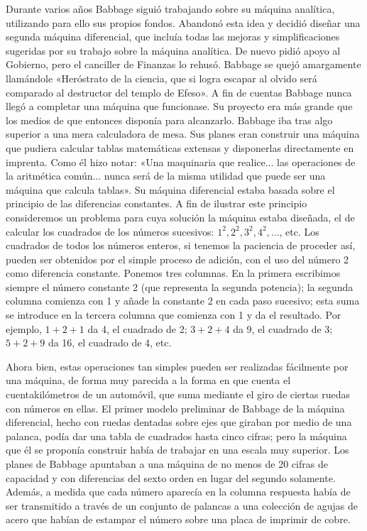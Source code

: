 \documentclass[a4paper, 12pt]{article}
\begin{document}
Durante varios años Babbage siguió trabajando sobre su máquina analítica, utilizando para ello sus propios fondos. Abandonó esta idea y decidió diseñar una segunda máquina diferencial, que incluía todas las mejoras y simplificaciones sugeridas por su trabajo sobre la máquina analítica. De nuevo pidió apoyo al Gobierno, pero el canciller de Finanzas lo rehusó. Babbage se quejó amargamente llamándole «Heróstrato de la ciencia, que si logra escapar al olvido será comparado al destructor del templo de Efeso». A fin de cuentas Babbage nunca llegó a completar una máquina que funcionase. Su proyecto era más grande que los medios de que entonces disponía para alcanzarlo. Babbage iba tras algo  superior a una mera calculadora de mesa. Sus planes eran construir una máquina que pudiera calcular tablas matemáticas extensas y disponerlas directamente en imprenta. Como él hizo notar: «Una maquinaria que realice... las operaciones de la aritmética común... nunca será de la misma utilidad que puede ser una máquina que calcula tablas». Su máquina diferencial estaba basada sobre el principio de las diferencias constantes. A fin de ilustrar este principio consideremos un problema para cuya solución la máquina estaba diseñada, el de calcular los cuadrados de los números sucesivos: $1^2,2^2, 3^2,4^2,\dots$, etc. Los cuadrados de todos los números enteros, si tenemos la paciencia de proceder así, pueden ser obtenidos por el simple proceso de adición, con el uso del número 2 como diferencia constante. Ponemos tres columnas. En la primera escribimos siempre el número constante 2 (que representa la segunda potencia); la segunda columna comienza con 1 y añade la constante 2 en cada paso sucesivo; esta suma se introduce en la tercera columna que comienza con 1 y da el resultado. Por ejemplo, $1+2+1$  da 4, el cuadrado de 2;
	$3+2+4$ da 9, el cuadrado de 3; $5+2+9$ da 16, el cuadrado de 4, etc.



Ahora bien, estas operaciones tan simples pueden ser realizadas fácilmente por una máquina, de forma muy parecida a la forma en que cuenta el cuentakilómetros de un automóvil, que suma mediante el giro de ciertas ruedas con números en ellas. El primer modelo preliminar de Babbage de la máquina diferencial, hecho con ruedas dentadas sobre ejes que giraban por medio de una palanca, podía dar una tabla de cuadrados hasta cinco cifras; pero la máquina que él se proponía construir había de trabajar en una escala muy superior. Los planes de Babbage apuntaban a una máquina de no menos de 20 cifras de capacidad y con diferencias del sexto orden en lugar del segundo solamente. Además, a medida que cada número aparecía en la columna respuesta había de ser transmitido a través de un conjunto de palancas a una colección de agujas de acero que habían de estampar el número sobre una placa de imprimir de cobre.
\end{document}
